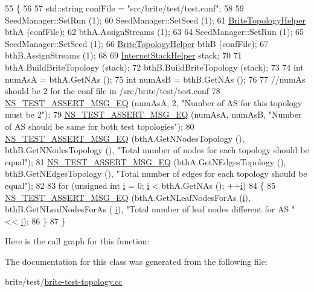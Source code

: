\begin{DoxyCode}
55 \{
56 
57   std::string confFile = \textcolor{stringliteral}{"src/brite/test/test.conf"};
58 
59   SeedManager::SetRun (1);
60   SeedManager::SetSeed (1);
61   \hyperlink{classns3_1_1BriteTopologyHelper}{BriteTopologyHelper} bthA (confFile);
62   bthA.AssignStreams (1);
63 
64   SeedManager::SetRun (1);
65   SeedManager::SetSeed (1);
66   \hyperlink{classns3_1_1BriteTopologyHelper}{BriteTopologyHelper} bthB (confFile);
67   bthB.AssignStreams (1);
68 
69   \hyperlink{classns3_1_1InternetStackHelper}{InternetStackHelper} stack;
70 
71   bthA.BuildBriteTopology (stack);
72   bthB.BuildBriteTopology (stack);
73 
74   \textcolor{keywordtype}{int} numAsA = bthA.GetNAs ();
75   \textcolor{keywordtype}{int} numAsB = bthB.GetNAs ();
76 
77   \textcolor{comment}{//numAs should be 2 for the conf file in /src/brite/test/test.conf}
78   \hyperlink{group__testing_ga2a9d78cffb3db8e867c35fff0b698cf5}{NS\_TEST\_ASSERT\_MSG\_EQ} (numAsA, 2, \textcolor{stringliteral}{"Number of AS for this topology must be 2"});
79   \hyperlink{group__testing_ga2a9d78cffb3db8e867c35fff0b698cf5}{NS\_TEST\_ASSERT\_MSG\_EQ} (numAsA, numAsB, \textcolor{stringliteral}{"Number of AS should be same for both test
       topologies"});
80   \hyperlink{group__testing_ga2a9d78cffb3db8e867c35fff0b698cf5}{NS\_TEST\_ASSERT\_MSG\_EQ} (bthA.GetNNodesTopology (), bthB.GetNNodesTopology (), \textcolor{stringliteral}{"Total
       number of nodes for each topology should be equal"});
81   \hyperlink{group__testing_ga2a9d78cffb3db8e867c35fff0b698cf5}{NS\_TEST\_ASSERT\_MSG\_EQ} (bthA.GetNEdgesTopology (), bthB.GetNEdgesTopology (), \textcolor{stringliteral}{"Total
       number of edges for each topology should be equal"});
82 
83   \textcolor{keywordflow}{for} (\textcolor{keywordtype}{unsigned} \textcolor{keywordtype}{int} \hyperlink{bernuolliDistribution_8m_a6f6ccfcf58b31cb6412107d9d5281426}{i} = 0; \hyperlink{bernuolliDistribution_8m_a6f6ccfcf58b31cb6412107d9d5281426}{i} < bthA.GetNAs (); ++\hyperlink{bernuolliDistribution_8m_a6f6ccfcf58b31cb6412107d9d5281426}{i})
84     \{
85       \hyperlink{group__testing_ga2a9d78cffb3db8e867c35fff0b698cf5}{NS\_TEST\_ASSERT\_MSG\_EQ} (bthA.GetNLeafNodesForAs (\hyperlink{bernuolliDistribution_8m_a6f6ccfcf58b31cb6412107d9d5281426}{i}), bthB.GetNLeafNodesForAs (
      \hyperlink{bernuolliDistribution_8m_a6f6ccfcf58b31cb6412107d9d5281426}{i}), \textcolor{stringliteral}{"Total number of leaf nodes different for AS "} << \hyperlink{bernuolliDistribution_8m_a6f6ccfcf58b31cb6412107d9d5281426}{i});
86     \}
87 \}
\end{DoxyCode}


Here is the call graph for this function\+:




The documentation for this class was generated from the following file\+:\begin{DoxyCompactItemize}
\item 
brite/test/\hyperlink{brite-test-topology_8cc}{brite-\/test-\/topology.\+cc}\end{DoxyCompactItemize}
